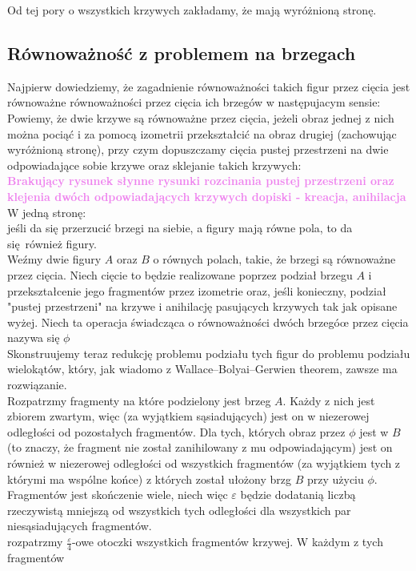 \documentclass[a4paper, 12pt]{article}
\newcommand{\rysunek}[1]{\hfill \break\\[16pt] \Huge \textbf{\textcolor{violet}{Brakujący rysunek \normalsize
#1}} \hfill
\break \\[16pt] \normalsize}
\begin{document}
Od tej pory o wszystkich krzywych zakładamy, że mają wyróżnioną stronę.
\subsection{Równoważność z problemem na brzegach}
Najpierw dowiedziemy, że zagadnienie równoważności takich figur przez cięcia jest równoważne równoważności
przez cięcia ich brzegów w następujacym sensie: \\
Powiemy, że dwie krzywe są równoważne przez cięcia, jeżeli obraz jednej z nich można pociąć i za pomocą
izometrii przekształcić na obraz drugiej (zachowując wyróżnioną stronę), przy czym dopuszczamy cięcia pustej
przestrzeni na dwie
odpowiadające sobie krzywe oraz sklejanie takich krzywych:
\rysunek{słynne rysunki rozcinania pustej przestrzeni oraz klejenia dwóch odpowiadających krzywych
dopiski - kreacja, anihilacja}
W jedną stronę: \\
jeśli da się przerzucić brzegi na siebie, a figury mają równe pola, to da się również figury. \\
Weźmy dwie figury $A$ oraz $B$ o równych polach, takie, że brzegi są równoważne przez cięcia. Niech cięcie
to będzie realizowane poprzez podział brzegu $A$ i przekształcenie jego fragmentów przez izometrie oraz,
jeśli konieczny, podział "pustej przestrzeni" na krzywe i anihilację pasujących krzywych tak jak opisane
wyżej. Niech ta operacja świadcząca o równoważności dwóch brzegóœ przez cięcia nazywa się $\phi$ \\
Skonstruujemy teraz redukcję problemu podziału tych figur do problemu podziału wielokątów, który, jak wiadomo
 z Wallace–Bolyai–Gerwien theorem, zawsze ma rozwiązanie. \\
Rozpatrzmy fragmenty na które podzielony jest brzeg $A$. Każdy z nich jest zbiorem zwartym, więc
(za wyjątkiem sąsiadujących) jest on w niezerowej odległości od pozostałych fragmentów. Dla tych, których
 obraz przez $\phi$ jest w $B$ (to znaczy, że fragment nie został zanihilowany z mu odpowiadającym)
 jest on również w niezerowej odległości od wszystkich fragmentów (za wyjątkiem tych z którymi ma wspólne
 końce) z których został ułożony brzg $B$ przy  użyciu $\phi$.  \\
Fragmentów jest skończenie wiele, niech więc $\varepsilon$ będzie dodatanią liczbą rzeczywistą mniejszą
od wszystkich tych odległości dla wszystkich par niesąsiadujących fragmentów. \\
rozpatrzmy $\frac{\varepsilon}{4}$-owe otoczki wszystkich fragmentów krzywej. W każdym z tych fragmentów
\end{document}
